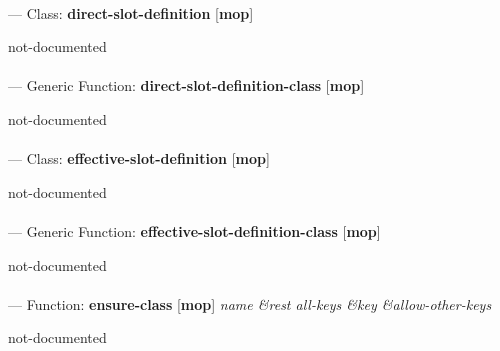 \paragraph{}
\label{MOP:DIRECT-SLOT-DEFINITION}
--- Class: \textbf{direct-slot-definition} [\textbf{mop}] \textit{}

\begin{adjustwidth}{5em}{5em}
not-documented
\end{adjustwidth}

\paragraph{}
\label{MOP:DIRECT-SLOT-DEFINITION-CLASS}
--- Generic Function: \textbf{direct-slot-definition-class} [\textbf{mop}] \textit{}

\begin{adjustwidth}{5em}{5em}
not-documented
\end{adjustwidth}

\paragraph{}
\label{MOP:EFFECTIVE-SLOT-DEFINITION}
--- Class: \textbf{effective-slot-definition} [\textbf{mop}] \textit{}

\begin{adjustwidth}{5em}{5em}
not-documented
\end{adjustwidth}

\paragraph{}
\label{MOP:EFFECTIVE-SLOT-DEFINITION-CLASS}
--- Generic Function: \textbf{effective-slot-definition-class} [\textbf{mop}] \textit{}

\begin{adjustwidth}{5em}{5em}
not-documented
\end{adjustwidth}

\paragraph{}
\label{MOP:ENSURE-CLASS}
--- Function: \textbf{ensure-class} [\textbf{mop}] \textit{name \&rest all-keys \&key \&allow-other-keys}

\begin{adjustwidth}{5em}{5em}
not-documented
\end{adjustwidth}

